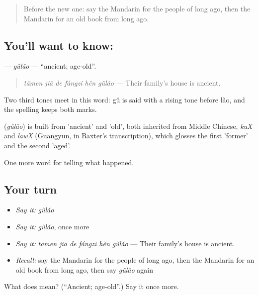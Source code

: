 \label{lesson:ZH-C321-gulao}



\begin{quote}
Before the new one: say the Mandarin for the people of long ago, then the Mandarin for an old book from long ago.
\end{quote}

\subsection*{You'll want to know: }
\textbf{} — \emph{gǔlǎo} — \textquotedblleft{}ancient; age-old\textquotedblright{}.

\begin{quote}
\textbf{} \emph{tāmen jiā de fángzi hěn gǔlǎo} — Their family's house is ancient.
\end{quote}

Two third tones meet in this word: gǔ is said with a rising tone before lǎo, and the spelling keeps both marks.

\begin{cousinweb}
\textbf{} (\emph{gǔlǎo}) is built from  'ancient' and  'old', both inherited from Middle Chinese, \emph{kuX} and \emph{lawX} (Guangyun, in Baxter's transcription), which glosses the first 'former' and the second 'aged'.
\end{cousinweb}

\begin{grammarlens}[title={What you've built}]
One more word for telling what happened.
\end{grammarlens}

\subsection*{Your turn}
\begin{itemize}
\raggedright
  \item \emph{Say it:} \emph{gǔlǎo}
  \item \emph{Say it:} \emph{gǔlǎo}, once more
  \item \emph{Say it:} \emph{tāmen jiā de fángzi hěn gǔlǎo} — Their family's house is ancient.
  \item \emph{Recall:} say the Mandarin for the people of long ago, then the Mandarin for an old book from long ago, then say \emph{gǔlǎo} again
\end{itemize}

\begin{tcolorbox}[breakable,colback=teal!4,colframe=teal!35!black,title={Before you move on}]
What does  mean? (\textquotedblleft{}Ancient; age-old\textquotedblright{}.) Say it once more.
\end{tcolorbox}

